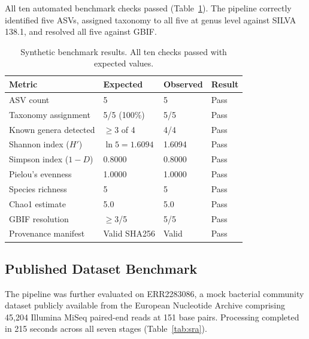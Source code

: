 \documentclass[runningheads]{llncs}
\begin{document}
All ten automated benchmark checks passed (Table~\ref{tab:synthetic}). The pipeline correctly identified five ASVs, assigned taxonomy to all five at genus level against SILVA 138.1, and resolved all five against GBIF.

\begin{table}[t]
\centering
\caption{Synthetic benchmark results. All ten checks passed with expected values.}
\label{tab:synthetic}
\begin{tabular}{llll}
\toprule
\textbf{Metric} & \textbf{Expected} & \textbf{Observed} & \textbf{Result} \\
\midrule
ASV count             & 5                & 5               & Pass \\
Taxonomy assignment   & 5/5 (100\%)      & 5/5             & Pass \\
Known genera detected & $\geq$3 of 4     & 4/4             & Pass \\
Shannon index ($H'$)  & $\ln 5 = 1.6094$ & 1.6094          & Pass \\
Simpson index ($1-D$) & 0.8000           & 0.8000          & Pass \\
Pielou's evenness     & 1.0000           & 1.0000          & Pass \\
Species richness      & 5                & 5               & Pass \\
Chao1 estimate        & 5.0              & 5.0             & Pass \\
GBIF resolution       & $\geq$3/5        & 5/5             & Pass \\
Provenance manifest   & Valid SHA256      & Valid           & Pass \\
\bottomrule
\end{tabular}
\end{table}

\subsection{Published Dataset Benchmark}

The pipeline was further evaluated on ERR2283086, a mock bacterial community dataset publicly available from the European Nucleotide Archive comprising 45,204 Illumina MiSeq paired-end reads at 151 base pairs. Processing completed in 215 seconds across all seven stages (Table~\ref{tab:sra}).
\end{document}
